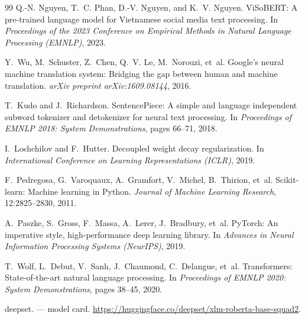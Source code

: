{\begin{thebibliography}{99}
Q.-N. Nguyen, T.~C. Phan, D.-V. Nguyen, and K.~V. Nguyen.
\newblock ViSoBERT: A pre-trained language model for Vietnamese social media text processing.
\newblock In \emph{Proceedings of the 2023 Conference on Empirical Methods in Natural Language Processing (EMNLP)}, 2023.

Y.~Wu, M.~Schuster, Z.~Chen, Q.~V. Le, M.~Norouzi, et~al.
\newblock Google's neural machine translation system: Bridging the gap between human and machine translation.
\newblock \emph{arXiv preprint arXiv:1609.08144}, 2016.

T.~Kudo and J.~Richardson.
\newblock SentencePiece: A simple and language independent subword tokenizer and detokenizer for neural text processing.
\newblock In \emph{Proceedings of EMNLP 2018: System Demonstrations}, pages 66--71, 2018.

I.~Loshchilov and F.~Hutter.
\newblock Decoupled weight decay regularization.
\newblock In \emph{International Conference on Learning Representations (ICLR)}, 2019.

F.~Pedregosa, G.~Varoquaux, A.~Gramfort, V.~Michel, B.~Thirion, et~al.
\newblock Scikit-learn: Machine learning in Python.
\newblock \emph{Journal of Machine Learning Research}, 12:2825--2830, 2011.

A.~Paszke, S.~Gross, F.~Massa, A.~Lerer, J.~Bradbury, et~al.
\newblock PyTorch: An imperative style, high-performance deep learning library.
\newblock In \emph{Advances in Neural Information Processing Systems (NeurIPS)}, 2019.

T.~Wolf, L.~Debut, V.~Sanh, J.~Chaumond, C.~Delangue, et~al.
\newblock Transformers: State-of-the-art natural language processing.
\newblock In \emph{Proceedings of EMNLP 2020: System Demonstrations}, pages 38--45, 2020.

deepset.
\newblock {} --- model card.
\newblock \url{https://huggingface.co/deepset/xlm-roberta-base-squad2}.

\end{thebibliography}
}
